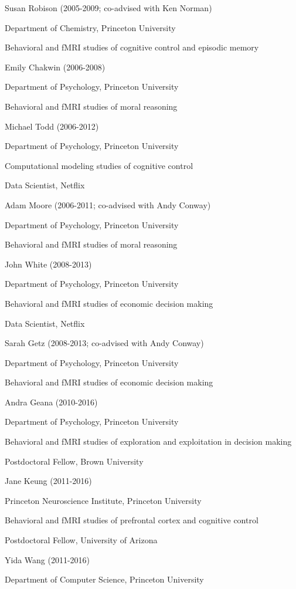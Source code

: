 \documentclass[10 pt]{article}
\begin{document}
Susan Robison (2005-2009; co-advised with Ken Norman)

Department of Chemistry, Princeton University

Behavioral and fMRI studies of cognitive control and episodic memory
    \medskip

Emily Chakwin (2006-2008)

Department of Psychology, Princeton University

Behavioral and fMRI studies of moral reasoning
    \medskip

Michael Todd (2006-2012)

Department of Psychology, Princeton University

Computational modeling studies of cognitive control

Data Scientist, Netflix
    \medskip

Adam Moore (2006-2011; co-advised with Andy Conway)

Department of Psychology, Princeton University

Behavioral and fMRI studies of moral reasoning
    \medskip

John White (2008-2013)

Department of Psychology, Princeton University

Behavioral and fMRI studies of economic decision making

Data Scientist, Netflix
    \medskip

Sarah Getz (2008-2013; co-advised with Andy Conway)

Department of Psychology, Princeton University

Behavioral and fMRI studies of economic decision making
    \medskip

Andra Geana (2010-2016)

Department of Psychology, Princeton University

Behavioral and fMRI studies of exploration and exploitation in decision making

Postdoctoral Fellow, Brown University
    \medskip

Jane Keung (2011-2016)

Princeton Neuroscience Institute, Princeton University

Behavioral and fMRI studies of prefrontal cortex and cognitive control

Postdoctoral Fellow, University of Arizona
    \medskip

Yida Wang (2011-2016)

Department of Computer Science, Princeton University
\end{document}
